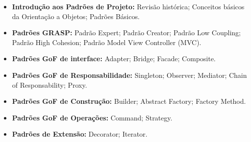 \begin{itemize}

 \item \textbf{Introdução aos Padrões de Projeto:} Revisão histórica; Conceitos básicos da Orientação a Objetos; Padrões Básicos.

 \item \textbf{Padrões GRASP: } Padrão Expert; Padrão Creator; Padrão Low Coupling; Padrão High Cohesion; Padrão Model View Controller (MVC).

 \item \textbf{Padrões GoF de interface:}  Adapter; Bridge; Facade; Composite.

 \item \textbf{Padrões GoF de Responsabilidade:} Singleton; Observer; Mediator; Chain of Responsability; Proxy.

 \item \textbf{Padrões GoF de Construção:} Builder; Abstract Factory; Factory Method.

 \item \textbf{Padrões GoF de Operações:} Command; Strategy.

 \item \textbf{Padrões de Extensão:} Decorator; Iterator.

\end{itemize}






